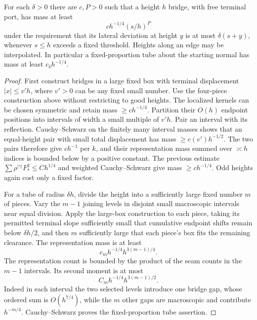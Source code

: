 \begin{lemma}
\label{lem:08-free-tube}
For each \(\delta>0\) there are \(c,P>0\) such that a height \(h\)
bridge, with free terminal port, has mass at least
\[
 c h^{-1/4}(s/h)^P
\]
under the requirement that its lateral deviation at height \(y\) is at
most \(\delta(s+y)\), whenever \(s\le h\) exceeds a fixed threshold.
Heights along an edge may be interpolated. In particular a fixed-proportion
tube about the starting normal has mass at least \(c_\delta h^{-1/4}\).
\end{lemma}
\begin{proof}
First construct bridges in a large fixed box with terminal displacement
\(|x|\le v'h\), where \(v'>0\) can be any fixed small number. Use the
four-piece construction above without restricting to good heights.
The localized kernels can be chosen symmetric and retain mass
\(\ge ch^{-1/4}\). Partition their \(O(h)\) endpoint positions into
intervals of width a small multiple of \(v'h\). Pair an interval with its
reflection. Cauchy--Schwarz on the finitely many interval masses shows
that an equal-height pair with small total displacement has mass
\(\ge c(v')h^{-1/2}\). The two pairs therefore give
\(ch^{-1}\) per \(k\), and their representation mass summed over
\(\asymp h\) indices is bounded below by a positive constant. The
previous estimate \(\sum\rho^{|\gamma|}F_*^2\le Ch^{1/4}\) and
weighted Cauchy--Schwarz give mass \(\ge ch^{-1/4}\). Odd heights again
cost only a fixed factor.

For a tube of radius \(\delta h\), divide the height into a sufficiently
large fixed number \(m\) of pieces. Vary the \(m-1\) joining levels in
disjoint small macroscopic intervals near equal division. Apply the
large-box construction to each piece, taking its permitted terminal
slope sufficiently small that cumulative endpoint shifts remain below
\(\delta h/2\), and then \(m\) sufficiently large that each piece's
box fits the remaining clearance. The representation mass is at least
\[
 c_m h^{-1/4}h^{3(m-1)/4}.
\]
The representation count is bounded by the product of the seam counts
in the \(m-1\) intervals. Its second moment is at most
\[
 C_m h^{-1/4}h^{3(m-1)/2}.
\]
Indeed in each interval the two selected levels introduce one bridge gap,
whose ordered sum is \(O(h^{7/4})\), while the \(m\) other gaps are
macroscopic and contribute \(h^{-m/4}\). Cauchy--Schwarz proves the
fixed-proportion tube assertion.


\end{proof}
